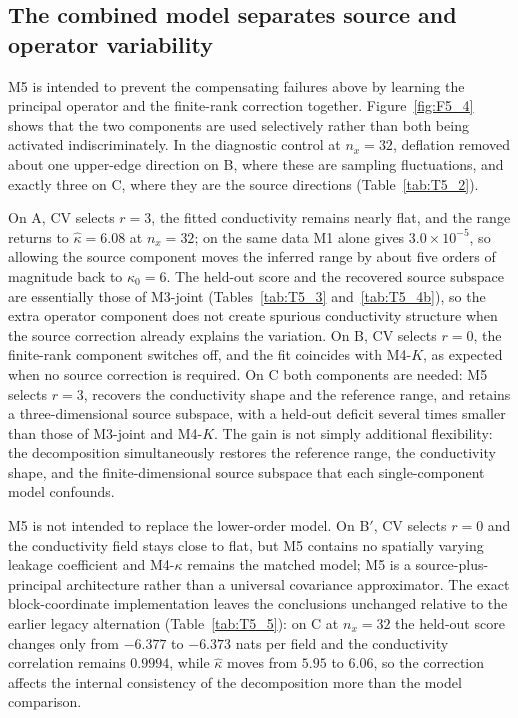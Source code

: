 \documentclass[11pt]{article}
\numberwithin{table}{section}
\numberwithin{figure}{section}
\begin{document}
\subsection{The combined model separates source and operator variability}
\label{sec:results_m5}

M5 is intended to prevent the compensating failures above by learning the principal operator and the finite-rank correction together. Figure~\ref{fig:F5_4} shows that the two components are used selectively rather than both being activated indiscriminately. In the diagnostic control at $n_x=32$, deflation removed about one upper-edge direction on B, where these are sampling fluctuations, and exactly three on C, where they are the source directions (Table~\ref{tab:T5_2}).

On A, CV selects $r=3$, the fitted conductivity remains nearly flat, and the range returns to $\widehat\kappa=6.08$ at $n_x=32$; on the same data M1 alone gives $3.0\times10^{-5}$, so allowing the source component moves the inferred range by about five orders of magnitude back to $\kappa_0=6$. The held-out score and the recovered source subspace are essentially those of M3-joint (Tables~\ref{tab:T5_3} and~\ref{tab:T5_4b}), so the extra operator component does not create spurious conductivity structure when the source correction already explains the variation. On B, CV selects $r=0$, the finite-rank component switches off, and the fit coincides with M4-$K$, as expected when no source correction is required. On C both components are needed: M5 selects $r=3$, recovers the conductivity shape and the reference range, and retains a three-dimensional source subspace, with a held-out deficit several times smaller than those of M3-joint and M4-$K$. The gain is not simply additional flexibility: the decomposition simultaneously restores the reference range, the conductivity shape, and the finite-dimensional source subspace that each single-component model confounds.

M5 is not intended to replace the lower-order model. On B$'$, CV selects $r=0$ and the conductivity field stays close to flat, but M5 contains no spatially varying leakage coefficient and M4-$\kappa$ remains the matched model; M5 is a source-plus-principal architecture rather than a universal covariance approximator. The exact block-coordinate implementation leaves the conclusions unchanged relative to the earlier legacy alternation (Table~\ref{tab:T5_5}): on C at $n_x=32$ the held-out score changes only from $-6.377$ to $-6.373$ nats per field and the conductivity correlation remains $0.9994$, while $\widehat\kappa$ moves from $5.95$ to $6.06$, so the correction affects the internal consistency of the decomposition more than the model comparison.
\end{document}
